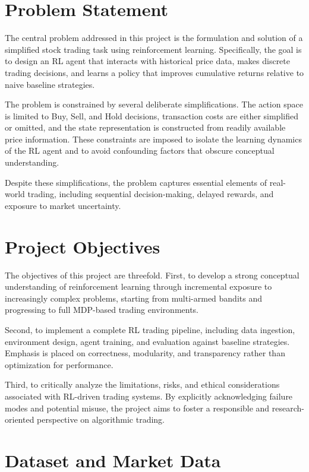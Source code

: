 \documentclass[12pt]{report}
\begin{document}
\chapter{Problem Statement}

The central problem addressed in this project is the formulation and solution of a simplified stock trading task using reinforcement learning. Specifically, the goal is to design an RL agent that interacts with historical price data, makes discrete trading decisions, and learns a policy that improves cumulative returns relative to naive baseline strategies.

The problem is constrained by several deliberate simplifications. The action space is limited to Buy, Sell, and Hold decisions, transaction costs are either simplified or omitted, and the state representation is constructed from readily available price information. These constraints are imposed to isolate the learning dynamics of the RL agent and to avoid confounding factors that obscure conceptual understanding.

Despite these simplifications, the problem captures essential elements of real-world trading, including sequential decision-making, delayed rewards, and exposure to market uncertainty.

\chapter{Project Objectives}

The objectives of this project are threefold. First, to develop a strong conceptual understanding of reinforcement learning through incremental exposure to increasingly complex problems, starting from multi-armed bandits and progressing to full MDP-based trading environments.

Second, to implement a complete RL trading pipeline, including data ingestion, environment design, agent training, and evaluation against baseline strategies. Emphasis is placed on correctness, modularity, and transparency rather than optimization for performance.

Third, to critically analyze the limitations, risks, and ethical considerations associated with RL-driven trading systems. By explicitly acknowledging failure modes and potential misuse, the project aims to foster a responsible and research-oriented perspective on algorithmic trading.

\chapter{Dataset and Market Data}
\end{document}
